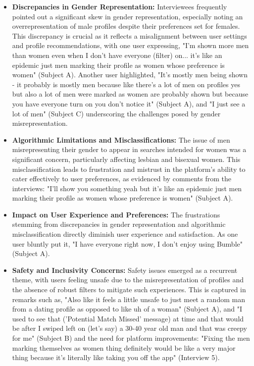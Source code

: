 \begin{itemize}
    \item \textbf{Discrepancies in Gender Representation:} Interviewees frequently pointed out a significant skew in gender representation, especially noting an overrepresentation of male profiles despite their preferences set for females. This discrepancy is crucial as it reflects a misalignment between user settings and profile recommendations, with one user expressing, "I'm shown more men than women even when I don’t have everyone (filter) on... it's like an epidemic just men marking their profile as women whose preference is women" (Subject A). Another user highlighted, "It's mostly men being shown - it probably is mostly men because like there's a lot of men on profiles yes but also a lot of men were marked as women are probably shown but because you have everyone turn on you don't notice it" (Subject A), and "I just see a lot of men" (Subject C) underscoring the challenges posed by gender misrepresentation.
    \item \textbf{Algorithmic Limitations and Misclassifications:} The issue of men misrepresenting their gender to appear in searches intended for women was a significant concern, particularly affecting lesbian and bisexual women. This misclassification leads to frustration and mistrust in the platform's ability to cater effectively to user preferences, as evidenced by comments from the interviews: "I'll show you something yeah but it's like an epidemic just men marking their profile as women whose preference is women" (Subject A).
    \item \textbf{Impact on User Experience and Preferences:} The frustrations stemming from discrepancies in gender representation and algorithmic misclassification directly diminish user experience and satisfaction. As one user bluntly put it, "I have everyone right now, I don't enjoy using Bumble" (Subject A).
    \item \textbf{Safety and Inclusivity Concerns:} Safety issues emerged as a recurrent theme, with users feeling unsafe due to the misrepresentation of profiles and the absence of robust filters to mitigate such experiences. This is captured in remarks such as, "Also like it feels a little unsafe to just meet a random man from a dating profile as opposed to like uh of a woman" (Subject A), and "I used to see that ('Potential Match Missed' message) at time and that would be after I swiped left on (let's say) a 30-40 year old man and that was creepy for me" (Subject B) and the need for platform improvements: "Fixing the men marking themselves as women thing definitely would be like a very major thing because it's literally like taking you off the app" (Interview 5).

\end{itemize}

